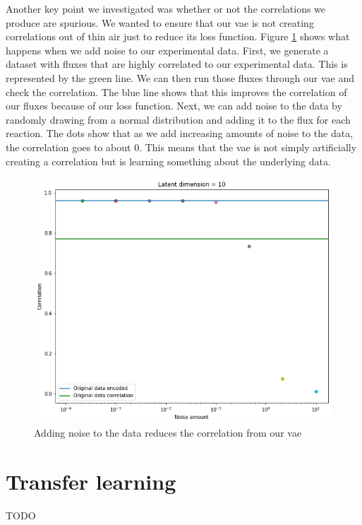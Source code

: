 Another key point we investigated was whether or not the correlations we produce are spurious.
We wanted to ensure that our \gls{vae} is not creating correlations out of thin air just to reduce its loss function.
Figure \ref{fig:noise} shows what happens when we add noise to our experimental data.
First, we generate a dataset with fluxes that are highly correlated to our experimental data.
This is represented by the green line. 
We can then run those fluxes through our \gls{vae} and check the correlation.
The blue line shows that this improves the correlation of our fluxes because of our loss function.
Next, we can add noise to the data by randomly drawing from a normal distribution and adding it to the flux for each reaction.
The dots show that as we add increasing amounts of noise to the data, the correlation goes to about 0.
This means that the \gls{vae} is not simply artificially creating a correlation but is learning something about the underlying data.

\begin{figure}[t!]
\begin{center}
\includegraphics{figs/Noise_add.png}
\caption{Adding noise to the data reduces the correlation from our \gls{vae}}
\end{center}
\label{fig:noise}
\end{figure}

\section{Transfer learning}

TODO

